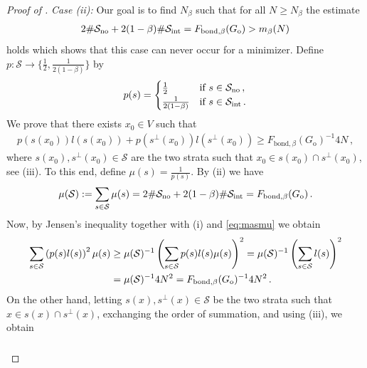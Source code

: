 \documentclass[reqno]{amsart}
\theoremstyle{plain}
\theoremstyle{definition}
\numberwithin{equation}{section}
\begin{document}
\begin{proof}[Proof of ]
\noindent \emph{Case (ii):}  Our goal is to find $N_\beta$ such that for all $N \ge N_\beta$ the estimate
\begin{align}\label{ineq:cardstrata}
2\#\mathcal{S}_{\rm no} +  2(1-\beta)\#\mathcal{S}_{\rm int} = F_{\mathrm{bond},\beta}( G_{\mathrm{o}} ) > m_\beta(N)
\end{align}
 holds which shows that this case can never occur for a minimizer. Define $p \colon \mathcal{S} \to \lbrace \frac{1}{2} ,  \frac{1}{2(1-\beta)} \rbrace  $ by
\begin{align}\label{def:p}
p(s) = \begin{cases} \frac{1}{2} &\text{if } s \in \mathcal{S}_{\rm no}\,,\\
\frac{1}{2(1-\beta)} &\text{if } s \in \mathcal{S}_{\rm int}\,.\\
\end{cases}
\end{align}
We prove that there exists $x_0 \in V$ such that
\begin{align}\label{ineq:biggestcross}
p(s(x_0)) l(s(x_0)) + p(s^\perp(x_0)) l(s^\perp(x_0)) \geq F_{\mathrm{bond},\beta}(G_{\mathrm{o}})^{-1} 4N\,,
\end{align}
where $s(x_0),s^\perp(x_0)\in \mathcal{S}$ are the two strata such that $ x_0 \in   s(x_0)\cap s^\perp(x_0)$, see (iii).  To this end, define $\mu(s)  = \frac{1}{p(s)}$. By (ii) we have 
\begin{align}\label{eq:masmu}
\mu(\mathcal{S}):= \sum_{s \in \mathcal{S}} \mu(s) = 2\#\mathcal{S}_{\rm no} + 2(1-\beta) \#\mathcal{S}_{\rm int}=F_{\mathrm{bond},\beta}(G_{\mathrm{o}})\,.
\end{align}
Now,  by Jensen's inequality together with (i) and \eqref{eq:masmu} we obtain
\begin{align}\label{ineq:jensen1}
\sum_{s\in\mathcal{S}} \left(p(s)l(s)\right)^2\mu(s)  &\geq \mu(\mathcal{S})^{-1} \left(\sum_{s\in\mathcal{S}} p(s)l(s)\mu(s)\right)^2 = \mu(\mathcal{S})^{-1} \left(\sum_{s\in \mathcal{S}}l(s)\right)^2 \notag \\&= \mu(\mathcal{S})^{-1} 4N^2 = F_{\mathrm{bond},\beta}(G_{\mathrm{o}})^{-1} 4 N^2\,.
\end{align}
On the other hand, letting $s(x),s^\perp(x)\in \mathcal{S}$ be the two strata such that $ x \in   s(x)\cap s^\perp(x)$, exchanging the order of summation, and using (iii), we obtain 
\begin{align}\label{eq:crosssum}\begin{split}

\end{split}
\end{align}
\end{proof}
\end{document}
